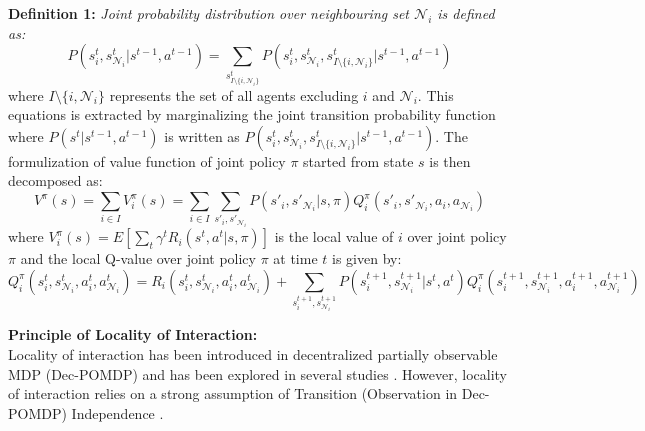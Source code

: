 \documentclass[journal,onecolumn]{IEEEtran}
\begin{document}
\textbf{Definition 1:} \textit{Joint probability distribution over neighbouring set $\mathcal{N}_i$ is defined as:}
\begin{equation}
P(s_i^{t},s_{\mathcal{N}_i}^{t}|s^{t-1},a^{t-1}) = \sum_{s_{I \setminus \{i,\mathcal{N}_i\}}^t}P(s_i^{t},s_{\mathcal{N}_i}^{t},s_{I \setminus \{i,\mathcal{N}_i\}}^t|s^{t-1},a^{t-1}) 
\end{equation}
where $I \setminus \{i,\mathcal{N}_i\}$ represents the set of all agents excluding $i$ and $\mathcal{N}_i$. This equations is extracted by marginalizing the joint transition probability function where $P(s^t|s^{t-1},a^{t-1})$ is written as $P(s_i^{t},s_{\mathcal{N}_i}^{t},s_{I \setminus \{i,\mathcal{N}_i\}}^t|s^{t-1},a^{t-1})$. The formulization of value function of joint policy $\pi$ started from state $s$ is then decomposed as:
\begin{equation}
V^{\pi}(s)=\sum_{i \in I}V_i^{\pi}(s)= \sum_{i \in I} \sum_{s'_i,s'_{\mathcal{N}_i}}P(s'_i,s'_{\mathcal{N}_i}|s,\pi)Q_i^{\pi}(s'_i,s'_{\mathcal{N}_i},a_i,a_{\mathcal{N}_i})
\label{1234}
\end{equation}
where $V_i^{\pi}(s) = E[\sum_t \gamma^t R_i(s^t, a^t|s,{\pi})]$ is the local value of $i$ over joint policy $\pi$ and the local Q-value over joint policy $\pi$ at time $t$ is given by: 
\begin{equation}
Q_i^{\pi}(s_i^t,s_{\mathcal{N}_i}^t, a_i^t,a_{\mathcal{N}_i}^t)= R_i(s_i^t,s_{\mathcal{N}_i}^t, a_i^t,a_{\mathcal{N}_i}^t)+\sum_{s_i^{t+1},s_{\mathcal{N}_i}^{t+1}}P(s_i^{t+1},s_{\mathcal{N}_i}^{t+1}|s^t,a^t) Q_i^{\pi}(s_i^{t+1},s_{\mathcal{N}_i}^{t+1}, a_i^{t+1},a_{\mathcal{N}_i}^{t+1})
\label{local-rewards}
\end{equation}



\textbf{Principle of Locality of Interaction:} \\
Locality of interaction has been introduced in decentralized partially observable MDP (Dec-POMDP) and has been explored in several studies \cite{melo2009learning}. However, locality of interaction relies on a strong assumption of Transition (Observation in Dec-POMDP) Independence \cite{becker2004solving}. 
\end{document}
